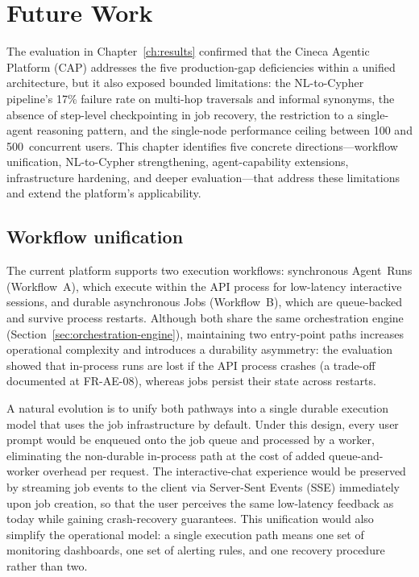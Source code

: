 \documentclass[a4paper]{sapthesis}
\begin{document}

\chapter{Future Work}
\label{ch:future-work}

The evaluation in Chapter~\ref{ch:results} confirmed that the Cineca
Agentic Platform (CAP) addresses the five production-gap deficiencies
within a unified architecture, but it also exposed bounded limitations:
the NL-to-Cypher pipeline's 17\% failure rate on multi-hop traversals and
informal synonyms, the absence of step-level checkpointing in job
recovery, the restriction to a single-agent reasoning pattern, and the
single-node performance ceiling between 100 and 500~concurrent users.
This chapter identifies five concrete directions---workflow unification,
NL-to-Cypher strengthening, agent-capability extensions, infrastructure
hardening, and deeper evaluation---that address these limitations and
extend the platform's applicability.

\section{Workflow unification}
\label{sec:fw-workflow}

The current platform supports two execution workflows: synchronous
Agent~Runs (Workflow~A), which execute within the API process for
low-latency interactive sessions, and durable asynchronous Jobs
(Workflow~B), which are queue-backed and survive process restarts.
Although both share the same orchestration engine
(Section~\ref{sec:orchestration-engine}), maintaining two entry-point
paths increases operational complexity and introduces a durability
asymmetry: the evaluation showed that in-process runs are lost if the API
process crashes (a trade-off documented at FR-AE-08), whereas jobs
persist their state across restarts.

A natural evolution is to unify both pathways into a single durable
execution model that uses the job infrastructure by default.  Under this
design, every user prompt would be enqueued onto the job queue and
processed by a worker, eliminating the non-durable in-process path at
the cost of added queue-and-worker overhead per request.  The
interactive-chat experience would be preserved by streaming job events
to the client via Server-Sent Events (SSE) immediately upon job creation,
so that the user perceives the same low-latency feedback as today while
gaining crash-recovery guarantees.  This unification would also simplify
the operational model: a single execution path means one set of monitoring
dashboards, one set of alerting rules, and one recovery procedure rather
than two.
\end{document}
